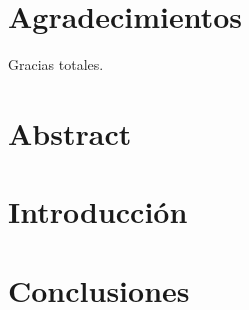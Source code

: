 \documentclass[12pt]{book}
\begin{document}

\chapter*{Agradecimientos}

Gracias totales.



\tableofcontents


\chapter*{Abstract}
\thispagestyle{empty}

\chapter*{Introducción}
\thispagestyle{empty}

\mainmatter %
\pagestyle{headings}



\thispagestyle{empty}


\thispagestyle{empty}


\thispagestyle{empty}


\thispagestyle{empty}

\chapter*{Conclusiones}
\thispagestyle{empty}


\end{document}
